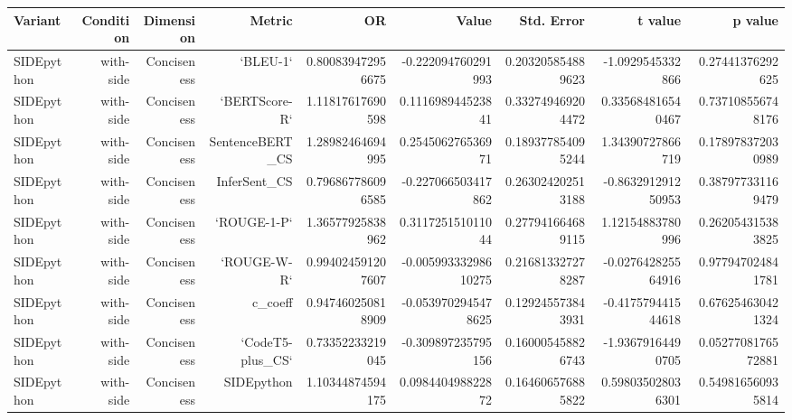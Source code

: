 \begin{tabular}{lrrrrrrrr}
\hline
Variant & Condition & Dimension & Metric & OR & Value & Std. Error & t value & p value
\\
\hline
SIDEpython & with-side & Conciseness & `BLEU-1` & 0.800839472956675 & -0.222094760291993 & 0.203205854889623 & -1.0929545332866 & 0.27441376292625
\\
SIDEpython & with-side & Conciseness & `BERTScore-R` & 1.11817617690598 & 0.111698944523841 & 0.332749469204472 & 0.335684816540467 & 0.737108556748176
\\
SIDEpython & with-side & Conciseness & SentenceBERT\_CS & 1.28982464694995 & 0.254506276536971 & 0.189377854095244 & 1.34390727866719 & 0.178978372030989
\\
SIDEpython & with-side & Conciseness & InferSent\_CS & 0.796867786096585 & -0.227066503417862 & 0.263024202513188 & -0.863291291250953 & 0.387977331169479
\\
SIDEpython & with-side & Conciseness & `ROUGE-1-P` & 1.36577925838962 & 0.311725151011044 & 0.277941664689115 & 1.12154883780996 & 0.262054315383825
\\
SIDEpython & with-side & Conciseness & `ROUGE-W-R` & 0.994024591207607 & -0.00599333298610275 & 0.216813327278287 & -0.027642825564916 & 0.977947024841781
\\
SIDEpython & with-side & Conciseness & c\_coeff & 0.947460250818909 & -0.0539702945478625 & 0.129245573843931 & -0.417579441544618 & 0.676254630421324
\\
SIDEpython & with-side & Conciseness & `CodeT5-plus\_CS` & 0.73352233219045 & -0.309897235795156 & 0.160005458826743 & -1.93679164490705 & 0.0527708176572881
\\
SIDEpython & with-side & Conciseness & SIDEpython & 1.10344874594175 & 0.098440498822872 & 0.164606576885822 & 0.598035028036301 & 0.549816560935814
\\
\hline
\end{tabular}
